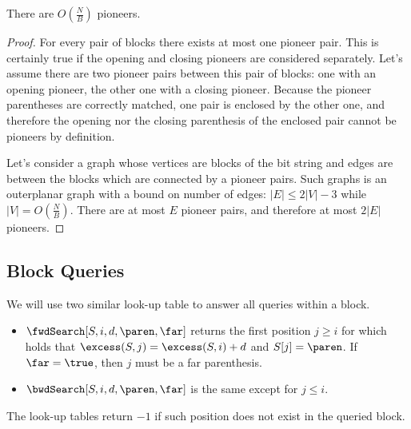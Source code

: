 \begin{lemma}
	There are $O\left(\frac{N}{B}\right)$ pioneers.
\end{lemma}
\begin{proof}
	For every pair of blocks there exists at most one pioneer pair.
	This is certainly true if the opening and closing pioneers are considered separately.
	Let's assume there are two pioneer pairs between this pair of blocks: one with an opening pioneer, the other one with a closing pioneer.
	Because the pioneer parentheses are correctly matched, one pair is enclosed by the other one, and therefore the opening nor the closing parenthesis of the enclosed pair cannot be pioneers by definition.
	
	Let's consider a graph whose vertices are blocks of the bit string and edges are between the blocks which are connected by a pioneer pairs.
	Such graphs is an outerplanar graph with a bound on number of edges: $|E| \le 2 |V| - 3$ while $|V| = O\left(\frac{N}{B}\right)$.
	There are at most $E$ pioneer pairs, and therefore at most $2 |E|$ pioneers.
\end{proof}

\subsection{Block Queries}

We will use two similar look-up table to answer all queries within a block.
\begin{itemize}
	\item $\fwdSearch[S, i, d, \paren, \far]$ returns the first position $j \ge i$ for which holds that $\excess(S, j) = \excess(S, i) + d$ and $S[j] = \paren$.
	If $\far = \true$, then $j$ must be a far parenthesis.
	\item $\bwdSearch[S, i, d, \paren, \far]$ is the same except for $j \le i$.
\end{itemize}
The look-up tables return $-1$ if such position does not exist in the queried block.

